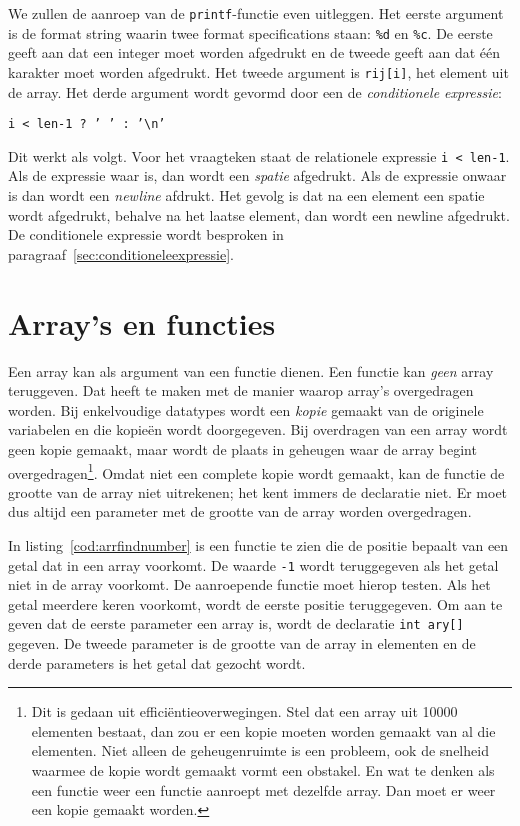 We zullen de aanroep van de \texttt{printf}-functie even uitleggen. Het eerste argument is de format string waarin twee format specifications staan: \texttt{\%d} en \texttt{\%c}. De eerste geeft aan dat een integer moet worden afgedrukt en de tweede geeft aan dat één karakter moet worden afgedrukt. Het tweede argument is \texttt{rij[i]}, het element uit de array.
Het derde argument wordt gevormd door een de \textsl{conditionele expressie}:

\hspace*{1em}\texttt{i < len-1 ? ' ' : '\textbackslash n'}

Dit werkt als volgt. Voor het vraagteken staat de relationele expressie \texttt{i < len-1}. Als de expressie waar is, dan wordt een \textsl{spatie} afgedrukt. Als de expressie onwaar is dan wordt een \textsl{newline} afdrukt. Het gevolg is dat na een element een spatie wordt afgedrukt, behalve na het laatse element, dan wordt een newline afgedrukt. De conditionele expressie wordt besproken in paragraaf~\ref{sec:conditioneleexpressie}.


\section{Array's en functies}
Een array kan als argument van een functie dienen. Een functie kan \textsl{geen} array teruggeven. Dat heeft te maken met de manier waarop array's overgedragen worden. Bij enkelvoudige datatypes wordt een \textsl{kopie} gemaakt van de originele variabelen en die kopieën wordt doorgegeven. Bij overdragen van een array wordt geen kopie gemaakt, maar wordt de plaats in geheugen waar de array begint overgedragen\footnote{Dit is gedaan uit efficiëntieoverwegingen. Stel dat een array uit 10000 elementen bestaat, dan zou er een kopie moeten worden gemaakt van al die elementen. Niet alleen de geheugenruimte is een probleem, ook de snelheid waarmee de kopie wordt gemaakt vormt een obstakel. En wat te denken als een functie weer een functie aanroept met dezelfde array. Dan moet er weer een kopie gemaakt worden.}. Omdat niet een complete kopie wordt gemaakt, kan de functie de grootte van de array niet uitrekenen; het kent immers de declaratie niet. Er moet dus altijd een parameter met de grootte van de array worden overgedragen.

In listing~\ref{cod:arrfindnumber} is een functie te zien die de positie bepaalt van een getal dat in een array voorkomt. De waarde \texttt{-1} wordt teruggegeven als het getal niet in de array voorkomt. De aanroepende functie moet hierop testen. Als het getal meerdere keren voorkomt, wordt de eerste positie teruggegeven. Om aan te geven dat de eerste parameter een array is, wordt de declaratie \texttt{int ary[]} gegeven. De tweede parameter is de grootte van de array in elementen en de derde parameters is het getal dat gezocht wordt.

